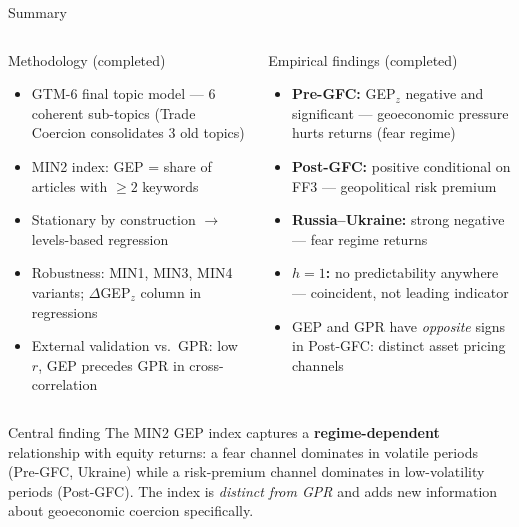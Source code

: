 \documentclass[aspectratio=169]{beamer}
\begin{document}
\begin{frame}{Summary}

\begin{columns}[T]
\begin{block}{Methodology (completed)}
\begin{itemize}\small
  \item GTM-6 final topic model — 6 coherent sub-topics
        (Trade Coercion consolidates 3 old topics)
  \item MIN2 index: GEP = share of articles with $\geq 2$ keywords
  \item Stationary by construction $\to$ levels-based regression
  \item Robustness: MIN1, MIN3, MIN4 variants;
        $\Delta$GEP$_z$ column in regressions
  \item External validation vs.\ GPR: low $r$,
        GEP precedes GPR in cross-correlation
\end{itemize}
\end{block}

\begin{block}{Empirical findings (completed)}
\begin{itemize}\small
  \item \textbf{Pre-GFC:} GEP$_z$ negative and significant —
        geoeconomic pressure hurts returns (fear regime)
  \item \textbf{Post-GFC:} positive conditional on FF3 —
        geopolitical risk premium
  \item \textbf{Russia--Ukraine:} strong negative —
        fear regime returns
  \item \textbf{$h=1$:} no predictability anywhere —
        coincident, not leading indicator
  \item GEP and GPR have \emph{opposite} signs in Post-GFC:
        distinct asset pricing channels
\end{itemize}
\end{block}
\end{columns}

\bigskip
\begin{alertblock}{Central finding}
  The MIN2 GEP index captures a \textbf{regime-dependent} relationship
  with equity returns: a fear channel dominates in volatile periods
  (Pre-GFC, Ukraine) while a risk-premium channel dominates in
  low-volatility periods (Post-GFC).
  The index is \emph{distinct from GPR} and adds new information
  about geoeconomic coercion specifically.
\end{alertblock}

\end{frame}

\end{document}
